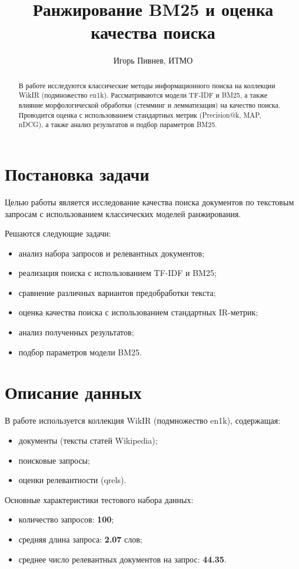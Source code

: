 \documentclass[11pt]{article}
\title{Ранжирование BM25 и оценка качества поиска}
\author{Игорь Пивнев, ИТМО}
\begin{document}
\maketitle

\begin{abstract}
В работе исследуются классические методы информационного поиска на коллекции
WikIR (подмножество en1k). Рассматриваются модели TF-IDF и BM25, а также влияние
морфологической обработки (стемминг и лемматизация) на качество поиска. Проводится
оценка с использованием стандартных метрик (Precision@k, MAP, nDCG), а также
анализ результатов и подбор параметров BM25.
\end{abstract}

\section{Постановка задачи}

Целью работы является исследование качества поиска документов по текстовым
запросам с использованием классических моделей ранжирования. 

Решаются следующие задачи:
\begin{itemize}
    \item анализ набора запросов и релевантных документов;
    \item реализация поиска с использованием TF-IDF и BM25;
    \item сравнение различных вариантов предобработки текста;
    \item оценка качества поиска с использованием стандартных IR-метрик;
    \item анализ полученных результатов;
    \item подбор параметров модели BM25.
\end{itemize}

\section{Описание данных}

В работе используется коллекция WikIR (подмножество en1k), содержащая:
\begin{itemize}
    \item документы (тексты статей Wikipedia);
    \item поисковые запросы;
    \item оценки релевантности (qrels).
\end{itemize}

Основные характеристики тестового набора данных:
\begin{itemize}
    \item количество запросов: \textbf{100};
    \item средняя длина запроса: \textbf{2.07} слов;
    \item среднее число релевантных документов на запрос: \textbf{44.35}.
\end{itemize}
\end{document}
